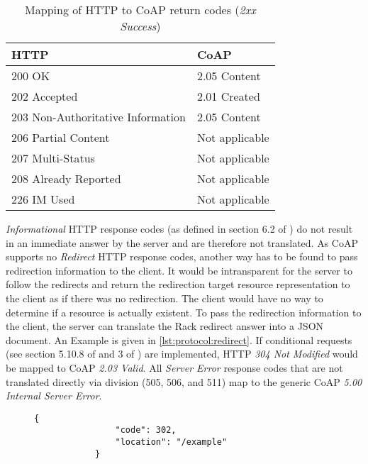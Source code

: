 	\begin{table}[h!]
		\begin{center}
			\begin{tabular}{l|l}
				\ac{HTTP}							& \ac{CoAP} \\
				\hline
				200 OK								& 2.05 Content \\
				202 Accepted						& 2.01 Created \\
				203 Non-Authoritative Information	& 2.05 Content \\
				206 Partial Content					& \scriptsize{Not applicable} \\
				207	Multi-Status					& \scriptsize{Not applicable} \\
				208 Already Reported				& \scriptsize{Not applicable} \\
				226 IM Used							& \scriptsize{Not applicable} \\
			\end{tabular}
		\end{center}
		\caption{Mapping of \ac{HTTP} to \ac{CoAP} return codes (\emph{2xx Success})}
		\label{table:mapping:codes:2xx}
	\end{table}
	
	\emph{Informational} \ac{HTTP} response codes (as defined in section 6.2 of
	\cite{http-1}) do not result in an immediate answer by the server and are
	therefore not translated. As \ac{CoAP} supports no \emph{Redirect}
	\ac{HTTP} response codes, another way has to be found to pass redirection
	information to the client. It would be intransparent for the server to
	follow the redirects and return the redirection target resource
	representation to the client as if there was no redirection. The client
	would have no way to determine if a resource is actually existent. To pass
	the redirection information to the client, the server can translate the
	Rack redirect answer into a \ac{JSON} document. An Example is given in
	\autoref{lst:protocol:redirect}. If conditional requests (see section
	5.10.8 of \cite{coap} and 3 of \cite{http-2}) are implemented, \ac{HTTP}
	\emph{304 Not Modified} would be mapped to \ac{CoAP} \emph{2.03 Valid}. All
	\emph{Server Error} response codes that are not translated directly via
	division (505, 506, and 511) map to the generic \ac{CoAP} \emph{5.00
	Internal Server Error}.

	\begin{figure}[h!]
		\begin{lstlisting}[gobble=6,caption={Exemplary \ac{JSON} redirect description},label=lst:protocol:redirect]
			{
				"code": 302,
				"location": "/example"
			}
		\end{lstlisting}
	\end{figure}
	
